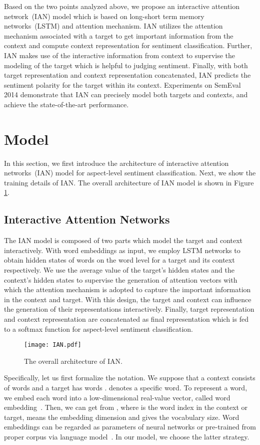 \documentclass{article}
\begin{document}
Based on the two points analyzed above,  we propose an interactive attention network~(IAN) model which is based on long-short term memory networks~(LSTM) and attention mechanism. 
IAN utilizes the attention mechanism associated with a target to get important information from the context and  compute context representation for sentiment classification.
Further, IAN makes use of the interactive information from context to supervise the modeling of the target which is helpful to judging sentiment. 
Finally, with both target representation and context representation concatenated, IAN predicts the sentiment polarity for the target within its context.
Experiments on SemEval 2014 demonstrate that  IAN can precisely model both targets and contexts, and achieve the state-of-the-art performance.

\section{Model}
In this section, we first introduce the architecture of interactive attention networks~(IAN) model for aspect-level sentiment classification.
Next, we show the training details of IAN.
The overall architecture of IAN model is shown in Figure \ref{fig:IAN}.
\subsection{Interactive Attention Networks}
The IAN model is composed of two parts which model the target and context interactively. 
With word embeddings as input, we employ LSTM networks to obtain hidden states of words on the word level for a target and its context respectively.
We use the average value of the target's hidden states and the context's hidden states to supervise the generation of attention vectors with which the attention mechanism is adopted to capture the important information in the context and target. With this design, the target and context can influence the generation of their representations interactively.
Finally, target representation and context representation are concatenated as final representation which is fed to a softmax function for aspect-level sentiment classification.
\begin{figure}[htb]
\centering
\texttt{[image: IAN.pdf]}
\caption{The overall architecture of IAN.}
\label{fig:IAN}
\end{figure}

Specifically, let us first formalize the notation. We suppose that a context consists of  words  and a target has   words .  denotes a specific word.
To represent a word, we embed each word into a low-dimensional  real-value vector, called word embedding~\cite{bengio2003neural}.
Then, we can get   from , where  is the word index in the context or target,  means the embedding dimension and  gives the vocabulary size.  
Word embeddings can be regarded as parameters of neural networks or pre-trained from proper corpus via language model~\cite{collobert2008unified,mikolov2010recurrent,huang2012improving,pennington2014glove}. In our model, we choose the latter strategy.
 
\end{document}
